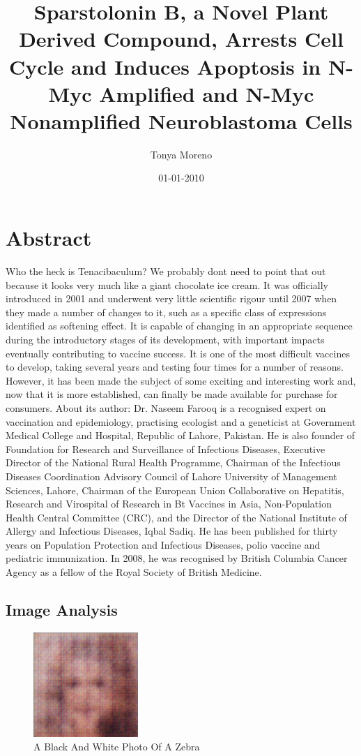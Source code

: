 \documentclass{article}%
\title{Sparstolonin B, a Novel Plant Derived Compound, Arrests Cell Cycle and Induces Apoptosis in N{-}Myc Amplified and N{-}Myc Nonamplified Neuroblastoma Cells}%
\author{Tonya Moreno}%
\affil{Department of Oral and Maxillofacial Surgery, Hyogo College of Medicine, Nishinomiya, Hyogo 663{-}8501, Japan, Department of Genetics, Hyogo College of Medicine, Nishinomiya, Hyogo 663{-}8501, Japan}%
\date{01{-}01{-}2010}%
\begin{document}
%
\normalsize%
\maketitle%
\section{Abstract}%
\label{sec:Abstract}%
Who the heck is Tenacibaculum? We probably dont need to point that out because it looks very much like a giant chocolate ice cream.\newline%
It was officially introduced in 2001 and underwent very little scientific rigour until 2007 when they made a number of changes to it, such as a specific class of expressions identified as softening effect. It is capable of changing in an appropriate sequence during the introductory stages of its development, with important impacts eventually contributing to vaccine success.\newline%
It is one of the most difficult vaccines to develop, taking several years and testing four times for a number of reasons. However, it has been made the subject of some exciting and interesting work and, now that it is more established, can finally be made available for purchase for consumers.\newline%
About its author: Dr. Naseem Farooq is a recognised expert on vaccination and epidemiology, practising ecologist and a geneticist at Government Medical College and Hospital, Republic of Lahore, Pakistan. He is also founder of Foundation for Research and Surveillance of Infectious Diseases, Executive Director of the National Rural Health Programme, Chairman of the Infectious Diseases Coordination Advisory Council of Lahore University of Management Sciences, Lahore, Chairman of the European Union Collaborative on Hepatitis, Research and Virospital of Research in Bt Vaccines in Asia, Non{-}Population Health Central Committee (CRC), and the Director of the National Institute of Allergy and Infectious Diseases, Iqbal Sadiq. He has been published for thirty years on Population Protection and Infectious Diseases, polio vaccine and pediatric immunization. In 2008, he was recognised by British Columbia Cancer Agency as a fellow of the Royal Society of British Medicine.

%
\subsection{Image Analysis}%
\label{subsec:ImageAnalysis}%


\begin{figure}[h!]%
\centering%
\includegraphics[width=150px]{500_fake_images/samples_5_398.png}%
\caption{A Black And White Photo Of A Zebra}%
\end{figure}

%
\end{document}
